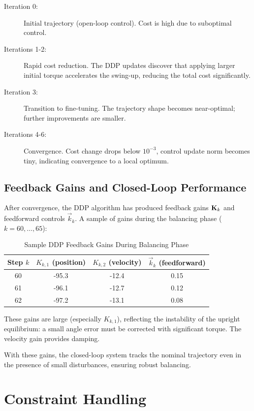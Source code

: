 \begin{description}
\item[Iteration 0:] Initial trajectory (open-loop control). Cost is high due to suboptimal control.
\item[Iterations 1-2:] Rapid cost reduction. The DDP updates discover that applying larger initial torque
      accelerates the swing-up, reducing the total cost significantly.
\item[Iteration 3:] Transition to fine-tuning. The trajectory shape becomes near-optimal; further improvements
      are smaller.
\item[Iterations 4-6:] Convergence. Cost change drops below $10^{-3}$, control update norm becomes tiny,
      indicating convergence to a local optimum.
\end{description}

\subsection{Feedback Gains and Closed-Loop Performance}

After convergence, the DDP algorithm has produced feedback gains $\mathbf{K}_k$ and feedforward controls $\vec{k}_k$.
A sample of gains during the balancing phase ($k = 60, \ldots, 65$):
\begin{table}[H]
\centering
\caption{Sample DDP Feedback Gains During Balancing Phase}
\label{tab:ch5:ddp-gains}
\begin{tabular}{c c c c}
\hline
Step $k$ & $K_{k,1}$ (position) & $K_{k,2}$ (velocity) & $\vec{k}_k$ (feedforward) \\
\hline
60 & -95.3 & -12.4 & 0.15 \\
61 & -96.1 & -12.7 & 0.12 \\
62 & -97.2 & -13.1 & 0.08 \\
\hline
\end{tabular}
\end{table}

These gains are large (especially $K_{k,1}$), reflecting the instability of the upright equilibrium: a small
angle error must be corrected with significant torque. The velocity gain provides damping.

With these gains, the closed-loop system tracks the nominal trajectory even in the presence of small disturbances,
ensuring robust balancing.

\section{Constraint Handling}

